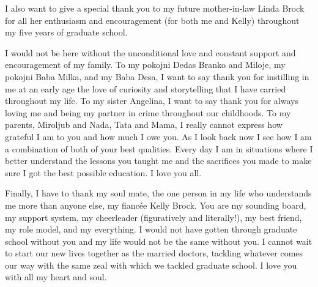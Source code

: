 \begin{doublespace}
I also want to give a special thank you to my future mother-in-law Linda Brock for all her enthusiasm and encouragement (for both me and Kelly) throughout my five years of graduate school.

I would not be here without the unconditional love and constant support and encouragement of my family. To my pokojni Dedas Branko and Miloje, my pokojni Baba Milka, and my Baba Desa, I want to say thank you for instilling in me at an early age the love of curiosity and storytelling that I have carried throughout my life. To my sister Angelina, I want to say thank you for always loving me and being my partner in crime throughout our childhoods. To my parents, Miroljub and Nada, Tata and Mama, I really cannot express how grateful I am to you and how much I owe you. As I look back now I see how I am a combination of both of your best qualities. Every day I am in situations where I better understand the lessons you taught me and the sacrifices you made to make sure I got the best possible education. I love you all. 

Finally, I have to thank my soul mate, the one person in my life who understands me more than anyone else, my fianc\'{e}e Kelly Brock. You are my sounding board, my support system, my cheerleader (figuratively and literally!), my best friend, my role model, and my everything. I would not have gotten through graduate school without you and my life would not be the same without you. I cannot wait to start our new lives together as the married doctors, tackling whatever comes our way with the same zeal with which we tackled graduate school. I love you with all my heart and soul. 

\end{doublespace}

